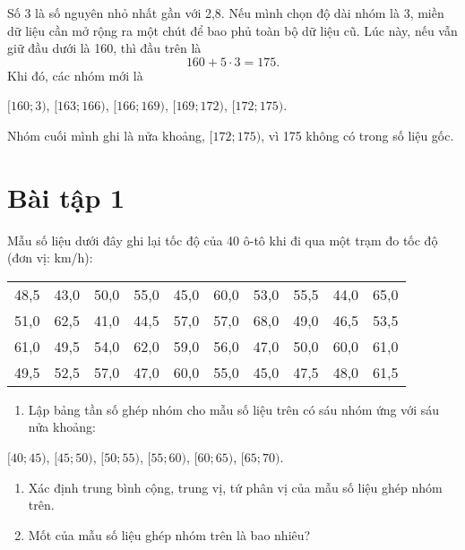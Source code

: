 \documentclass[
  letterpaper,
  DIV=11,
  numbers=noendperiod]{scrartcl}
\providecommand{\tightlist}{%
  \setlength{\itemsep}{0pt}\setlength{\parskip}{0pt}}\usepackage{longtable,booktabs,array}
\begin{document}
Số 3 là số nguyên nhỏ nhất gần với 2,8. Nếu mình chọn độ dài nhóm là 3,
miền dữ liệu cần mở rộng ra một chút để bao phủ toàn bộ dữ liệu cũ. Lúc
này, nếu vẫn giữ đầu dưới là 160, thì đầu trên là \[
160+5\cdot 3 = 175.
\] Khi đó, các nhóm mới là

\([160;3)\), \([163;166)\), \([166;169)\), \([169;172)\), \([172;175)\).

Nhóm cuối mình ghi là nửa khoảng, \([172; 175)\), vì 175 không có trong
số liệu gốc.

\section*{Bài tập 1}

Mẫu số liệu dưới đây ghi lại tốc độ của 40 ô-tô khi đi qua một trạm đo
tốc độ (đơn vị: km/h):

\begin{table}[!h]
\centering
\begin{tabular}{cccccccccc}
\toprule
48,5 & 43,0 & 50,0 & 55,0 & 45,0 & 60,0 & 53,0 & 55,5 & 44,0 & 65,0\\
51,0 & 62,5 & 41,0 & 44,5 & 57,0 & 57,0 & 68,0 & 49,0 & 46,5 & 53,5\\
61,0 & 49,5 & 54,0 & 62,0 & 59,0 & 56,0 & 47,0 & 50,0 & 60,0 & 61,0\\
49,5 & 52,5 & 57,0 & 47,0 & 60,0 & 55,0 & 45,0 & 47,5 & 48,0 & 61,5\\
\bottomrule
\end{tabular}
\end{table}

\begin{enumerate}
\def\labelenumi{\alph{enumi}.}
\tightlist
\item
  Lập bảng tần số ghép nhóm cho mẫu số liệu trên có sáu nhóm ứng với sáu
  nửa khoảng:
\end{enumerate}

\begin{center}
$[40; 45)$, $[45 ; 50)$, $[50; 55)$, $[55 ; 60)$, $[60; 65)$, $[65; 70)$.
\end{center}

\begin{enumerate}
\def\labelenumi{\alph{enumi}.}
\setcounter{enumi}{1}
\item
  Xác định trung bình cộng, trung vị, tứ phân vị của mẫu số liệu ghép
  nhóm trên.
\item
  Mốt của mẫu số liệu ghép nhóm trên là bao nhiêu?
\end{enumerate}
\end{document}
